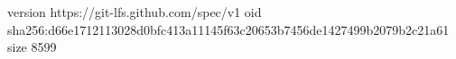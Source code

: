version https://git-lfs.github.com/spec/v1
oid sha256:d66e1712113028d0bfc413a11145f63c20653b7456de1427499b2079b2c21a61
size 8599
